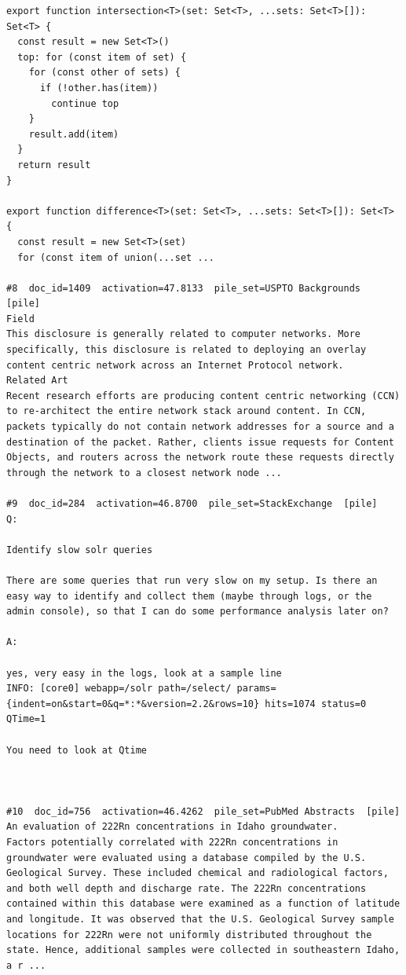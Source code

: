 \begin{verbatim}
export function intersection<T>(set: Set<T>, ...sets: Set<T>[]): Set<T> {
  const result = new Set<T>()
  top: for (const item of set) {
    for (const other of sets) {
      if (!other.has(item))
        continue top
    }
    result.add(item)
  }
  return result
}

export function difference<T>(set: Set<T>, ...sets: Set<T>[]): Set<T> {
  const result = new Set<T>(set)
  for (const item of union(...set ...

#8  doc_id=1409  activation=47.8133  pile_set=USPTO Backgrounds  [pile]
Field
This disclosure is generally related to computer networks. More specifically, this disclosure is related to deploying an overlay content centric network across an Internet Protocol network.
Related Art
Recent research efforts are producing content centric networking (CCN) to re-architect the entire network stack around content. In CCN, packets typically do not contain network addresses for a source and a destination of the packet. Rather, clients issue requests for Content Objects, and routers across the network route these requests directly through the network to a closest network node ...

#9  doc_id=284  activation=46.8700  pile_set=StackExchange  [pile]
Q:

Identify slow solr queries

There are some queries that run very slow on my setup. Is there an easy way to identify and collect them (maybe through logs, or the admin console), so that I can do some performance analysis later on?

A:

yes, very easy in the logs, look at a sample line
INFO: [core0] webapp=/solr path=/select/ params={indent=on&start=0&q=*:*&version=2.2&rows=10} hits=1074 status=0 QTime=1 

You need to look at Qtime



#10  doc_id=756  activation=46.4262  pile_set=PubMed Abstracts  [pile]
An evaluation of 222Rn concentrations in Idaho groundwater.
Factors potentially correlated with 222Rn concentrations in groundwater were evaluated using a database compiled by the U.S. Geological Survey. These included chemical and radiological factors, and both well depth and discharge rate. The 222Rn concentrations contained within this database were examined as a function of latitude and longitude. It was observed that the U.S. Geological Survey sample locations for 222Rn were not uniformly distributed throughout the state. Hence, additional samples were collected in southeastern Idaho, a r ...


\end{verbatim}
